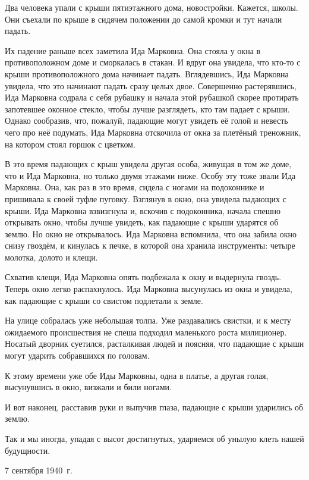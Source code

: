 Два человека упали с крыши пятиэтажного дома, новостройки. Кажется, школы. Они съехали по крыше в сидячем положении до самой кромки и тут начали падать.

Их падение раньше всех заметила Ида Марковна. Она стояла у окна в противоположном доме и сморкалась в стакан. И вдруг она увидела, что кто-то с крыши противоположного дома начинает падать. Вглядевшись, Ида Марковна увидела, что это начинают падать сразу целых двое. Совершенно растерявшись, Ида Марковна содрала с себя рубашку и начала этой рубашкой скорее протирать запотевшее оконное стекло, чтобы лучше разглядеть, кто там падает с крыши. Однако сообразив, что, пожалуй, падающие могут увидеть её голой и невесть чего про неё подумать, Ида Марковна отскочила от окна за плетёный треножник, на котором стоял горшок с цветком.

В это время падающих с крыш увидела другая особа, живущая в том же доме, что и Ида Марковна, но только двумя этажами ниже. Особу эту тоже звали Ида Марковна. Она, как раз в это время, сидела с ногами на подоконнике и пришивала к своей туфле пуговку. Взглянув в окно, она увидела падающих с крыши. Ида Марковна взвизгнула и, вскочив с подоконника, начала спешно открывать окно, чтобы лучше увидеть, как падающие с крыши ударятся об землю. Но окно не открывалось. Ида Марковна вспомнила, что она забила окно снизу гвоздём, и кинулась к печке, в которой она хранила инструменты: четыре молотка, долото и клещи.

Схватив клещи, Ида Марковна опять подбежала к окну и выдернула гвоздь. Теперь окно легко распахнулось. Ида Марковна высунулась из окна и увидела, как падающие с крыши со свистом подлетали к земле.

На улице собралась уже небольшая толпа. Уже раздавались свистки, и к месту ожидаемого происшествия не спеша подходил маленького роста милиционер. Носатый дворник суетился, расталкивая людей и поясняя, что падающие с крыши могут ударить собравшихся по головам.

К этому времени уже обе Иды Марковны, одна в платье, а другая голая, высунувшись в окно, визжали и били ногами.

И вот наконец, расставив руки и выпучив глаза, падающие с крыши ударились об землю.

Так и мы иногда, упадая с высот достигнутых, ударяемся об унылую клеть нашей будущности.

7 сентября 1940~г.